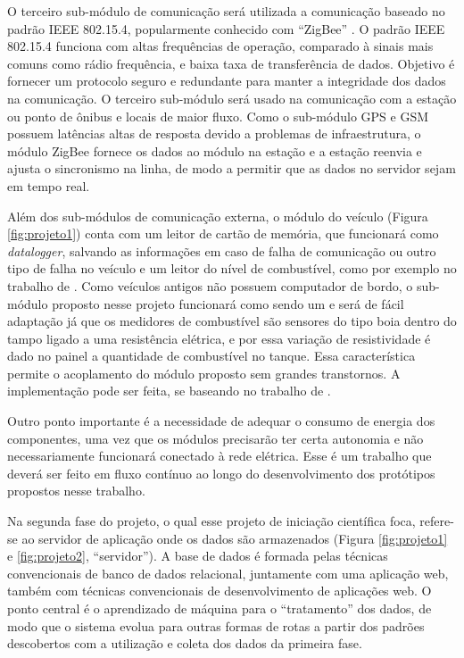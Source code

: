 \documentclass[12pt]{uftpibic}
\begin{document}
O terceiro sub-módulo de comunicação será utilizada a comunicação baseado no padrão IEEE 802.15.4, popularmente conhecido com ``ZigBee'' \cite{Hoang}. O padrão IEEE 802.15.4 funciona com altas frequências de operação, comparado à sinais mais comuns como rádio frequência, e baixa taxa de transferência de dados. Objetivo é fornecer um protocolo seguro e redundante para manter a integridade dos dados na comunicação. O terceiro sub-módulo será usado na comunicação com a estação ou ponto de ônibus e locais de maior fluxo. Como o sub-módulo GPS e GSM possuem latências altas de resposta devido a problemas de infraestrutura, o módulo ZigBee fornece os dados ao módulo na estação e a estação reenvia e ajusta o sincronismo na linha, de modo a permitir que as dados no servidor sejam em tempo real.

Além dos sub-módulos de comunicação externa, o módulo do veículo (Figura \ref{fig:projeto1}) conta com um leitor de cartão de memória, que funcionará como \textit{datalogger}, salvando as informações em caso de falha de comunicação ou outro tipo de falha no veículo e um leitor do nível de combustível, como por exemplo no trabalho de . Como veículos antigos não possuem computador de bordo, o sub-módulo proposto nesse projeto funcionará como sendo um e será de fácil adaptação já que os medidores de combustível são sensores do tipo boia dentro do tampo ligado a uma resistência elétrica, e por essa variação de resistividade é dado no painel a quantidade de combustível no tanque. Essa característica permite o acoplamento do módulo proposto sem grandes transtornos. A implementação pode ser feita, se baseando no trabalho de .

Outro ponto importante é a necessidade de adequar o consumo de energia dos componentes, uma vez que os módulos precisarão ter certa autonomia e não necessariamente funcionará conectado à rede elétrica. Esse é um trabalho que deverá ser feito em fluxo contínuo ao longo do desenvolvimento dos protótipos propostos nesse trabalho.

Na segunda fase do projeto, o qual esse projeto de iniciação científica foca, refere-se ao servidor de aplicação onde os dados são armazenados (Figura \ref{fig:projeto1} e \ref{fig:projeto2}, ``servidor''). A base de dados é formada pelas técnicas convencionais de banco de dados relacional, juntamente com uma aplicação web, também com técnicas convencionais de desenvolvimento de aplicações web. O ponto central é o aprendizado de máquina para o ``tratamento'' dos dados, de modo que o sistema evolua para outras formas de rotas a partir dos padrões descobertos com a utilização e coleta dos dados da primeira fase.
\end{document}
